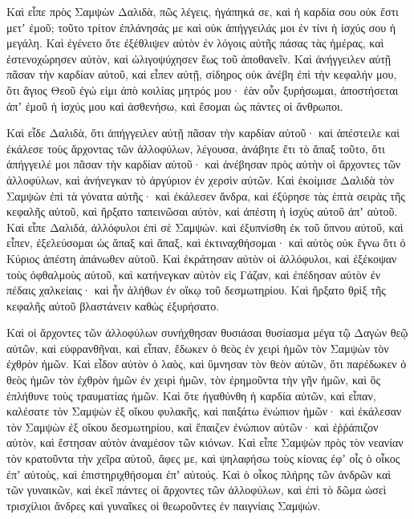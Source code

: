 {\par }{\PP {}Καὶ εἶπε πρὸς Σαμψὼν Δαλιδὰ, πῶς λέγεις, ἠγάπηκά σε, καὶ ἡ καρδία σου οὐκ ἔστι μετʼ ἐμοῦ; τοῦτο τρίτον ἐπλάνησάς με καὶ οὐκ ἀπήγγειλάς μοι ἐν τίνι ἡ ἰσχύς σου ἡ μεγάλη.
Καὶ ἐγένετο ὅτε ἐξέθλιψεν αὐτὸν ἐν λόγοις αὐτῆς πάσας τὰς ἡμέρας, καὶ ἐστενοχώρησεν αὐτὸν, καὶ ὠλιγοψύχησεν ἕως τοῦ ἀποθανεῖν.
Καὶ ἀνήγγειλεν αὐτῇ πᾶσαν τὴν καρδίαν αὐτοῦ, καὶ εἶπεν αὐτῇ, σίδηρος οὐκ ἀνέβη ἐπὶ τὴν κεφαλήν μου, ὅτι ἅγιος Θεοῦ ἐγώ εἰμι ἀπὸ κοιλίας μητρός μου· ἐὰν οὖν ξυρήσωμαι, ἀποστήσεται ἀπʼ ἐμοῦ ἡ ἰσχύς μου καὶ ἀσθενήσω, καὶ ἔσομαι ὡς πάντες οἱ ἄνθρωποι.
\par }{\PP {}Καὶ εἶδε Δαλιδὰ, ὅτι ἀπήγγειλεν αὐτῇ πᾶσαν τὴν καρδίαν αὐτοῦ· καὶ ἀπέστειλε καὶ ἐκάλεσε τοὺς ἄρχοντας τῶν ἀλλοφύλων, λέγουσα, ἀνάβητε ἔτι τὸ ἅπαξ τοῦτο, ὅτι ἀπήγγειλέ μοι πᾶσαν τὴν καρδίαν αὐτοῦ· καὶ ἀνέβησαν πρὸς αὐτὴν οἱ ἄρχοντες τῶν ἀλλοφύλων, καὶ ἀνήνεγκαν τὸ ἀργύριον ἐν χερσὶν αὐτῶν.
Καὶ ἐκοίμισε Δαλιδὰ τὸν Σαμψὼν ἐπὶ τὰ γόνατα αὐτῆς· καὶ ἐκάλεσεν ἄνδρα, καὶ ἐξύρησε τὰς ἑπτὰ σειρὰς τῆς κεφαλῆς αὐτοῦ, καὶ ἤρξατο ταπεινῶσαι αὐτὸν, καὶ ἀπέστη ἡ ἰσχὺς αὐτοῦ ἀπʼ αὐτοῦ.
Καὶ εἶπε Δαλιδά, ἀλλόφυλοι ἐπὶ σὲ Σαμψών. καὶ ἐξυπνίσθη ἐκ τοῦ ὕπνου αὐτοῦ, καὶ εἶπεν, ἐξελεύσομαι ὡς ἅπαξ καὶ ἅπαξ, καὶ ἐκτιναχθήσομαι· καὶ αὐτὸς οὐκ ἔγνω ὅτι ὁ Κύριος ἀπέστη ἀπάνωθεν αὐτοῦ.
Καὶ ἐκράτησαν αὐτὸν οἱ ἀλλόφυλοι, καὶ ἐξέκοψαν τοὺς ὀφθαλμοὺς αὐτοῦ, καὶ κατήνεγκαν αὐτὸν εἰς Γάζαν, καὶ ἐπέδησαν αὐτὸν ἐν πέδαις χαλκείαις· καὶ ἦν ἀλήθων ἐν οἴκῳ τοῦ δεσμωτηρίου.
Καὶ ἤρξατο θρὶξ τῆς κεφαλῆς αὐτοῦ βλαστάνειν καθὼς ἐξυρήσατο.
\par }{\PP {}Καὶ οἱ ἄρχοντες τῶν ἀλλοφύλων συνήχθησαν θυσιάσαι θυσίασμα μέγα τῷ Δαγὼν θεῷ αὐτῶν, καὶ εὐφρανθῆναι, καὶ εἶπαν, ἔδωκεν ὁ θεὸς ἐν χειρὶ ἡμῶν τὸν Σαμψὼν τὸν ἐχθρὸν ἡμῶν.
Καὶ εἶδον αὐτὸν ὁ λαὸς, καὶ ὕμνησαν τὸν θεὸν αὐτῶν, ὅτι παρέδωκεν ὁ θεὸς ἡμῶν τὸν ἐχθρὸν ἡμῶν ἐν χειρὶ ἡμῶν, τὸν ἐρημοῦντα τὴν γῆν ἡμῶν, καὶ ὃς ἐπλήθυνε τοὺς τραυματίας ἡμῶν.
Καὶ ὅτε ἠγαθύνθη ἡ καρδία αὐτῶν, καὶ εἶπαν, καλέσατε τὸν Σαμψὼν ἐξ οἴκου φυλακῆς, καὶ παιξάτω ἐνώπιον ἡμῶν· καὶ ἐκάλεσαν τὸν Σαμψὼν ἐξ οἴκου δεσμωτηρίου, καὶ ἔπαιζεν ἐνώπιον αὐτῶν· καὶ ἐῤῥάπιζον αὐτὸν, καὶ ἔστησαν αὐτὸν ἀναμέσον τῶν κιόνων.
Καὶ εἶπε Σαμψὼν πρὸς τὸν νεανίαν τὸν κρατοῦντα τὴν χεῖρα αὐτοῦ, ἄφες με, καὶ ψηλαφήσω τοὺς κίονας ἐφʼ οἷς ὁ οἶκος ἐπʼ αὐτοὺς, καὶ ἐπιστηριχθήσομαι ἐπʼ αὐτούς.
Καὶ ὁ οἶκος πλήρης τῶν ἀνδρῶν καὶ τῶν γυναικῶν, καὶ ἐκεῖ πάντες οἱ ἄρχοντες τῶν ἀλλοφύλων, καὶ ἐπὶ τὸ δῶμα ὡσεὶ τρισχίλιοι ἄνδρες καὶ γυναῖκες οἱ θεωροῦντες ἐν παιγνίαις Σαμψών.
}
